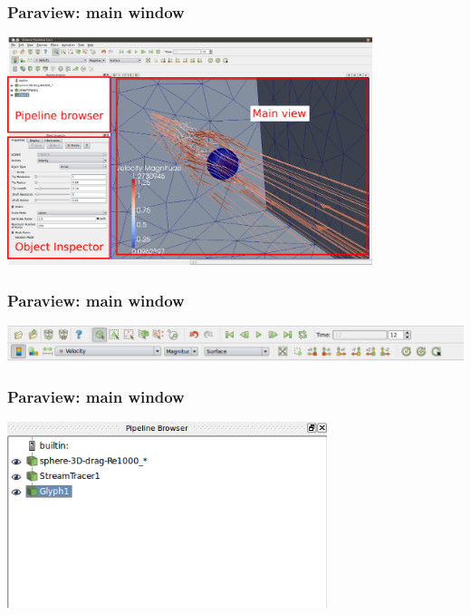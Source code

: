 \documentclass[12pt]{beamer}
\begin{document}
\begin{frame}
    \frametitle{Paraview: main window}
\begin{center}
\includegraphics[width=0.8\textwidth]{images/paraview_window.png}
\end{center}
\end{frame}
\begin{frame}
    \frametitle{Paraview: main window}
\begin{center}
\includegraphics[width=\textwidth]{images/paraview_toolbar.png}
\end{center}
\end{frame}
\begin{frame}
    \frametitle{Paraview: main window}
\begin{center}
\includegraphics[width=0.7\textwidth]{images/paraview_pipeline.png}
\end{center}
\end{frame}
\end{document}
